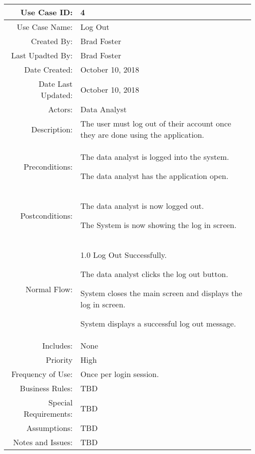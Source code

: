 \documentclass[12pt,oneside,letterpaper]{article}
\newenvironment{packed_enumerate}{ %
\vspace{-7mm}
\begin{enumerate}
  \setlength{\itemsep}{0pt}
  \setlength{\parskip}{0pt}
  \setlength{\parsep}{0pt}
}{\end{enumerate}
\vspace{-8mm}}
\begin{document}
\begin{longtable}{|r|p{3.8in}|}
\hline
Use Case ID:&4\\
\hline
Use Case Name:&Log Out\\
\hline
Created By:&Brad Foster\\
\hline
Last Upadted By:&Brad Foster\\
\hline
Date Created:&October 10, 2018\\
\hline
Date Last Updated:&October 10, 2018\\
\hline
Actors:&Data Analyst\\
\hline
Description:&The user must log out of their account once they are done using the application.\\
\hline
Preconditions:&\begin{packed_enumerate}
\item The data analyst is logged into the system.
\item The data analyst has the application open.
\end{packed_enumerate}\\
\hline
Postconditions:&\begin{packed_enumerate}
\item The data analyst is now logged out.
\item The System is now showing the log in screen.
\end{packed_enumerate}\\
\hline
Normal Flow:&1.0 Log Out Successfully.\newline
\begin{packed_enumerate}
\item The data analyst clicks the log out button.
\item System closes the main screen and displays the log in screen.
\item System displays a successful log out message.
\end{packed_enumerate}\\
\hline
Includes:&None\\
\hline
Priority&High\\
\hline
Frequency of Use:&Once per login session.\\
\hline
Business Rules:&TBD\\
\hline
Special Requirements:&TBD\\
\hline
Assumptions:&TBD\\
\hline
Notes and Issues:&TBD\\
\hline
\end{longtable}
\end{document}
